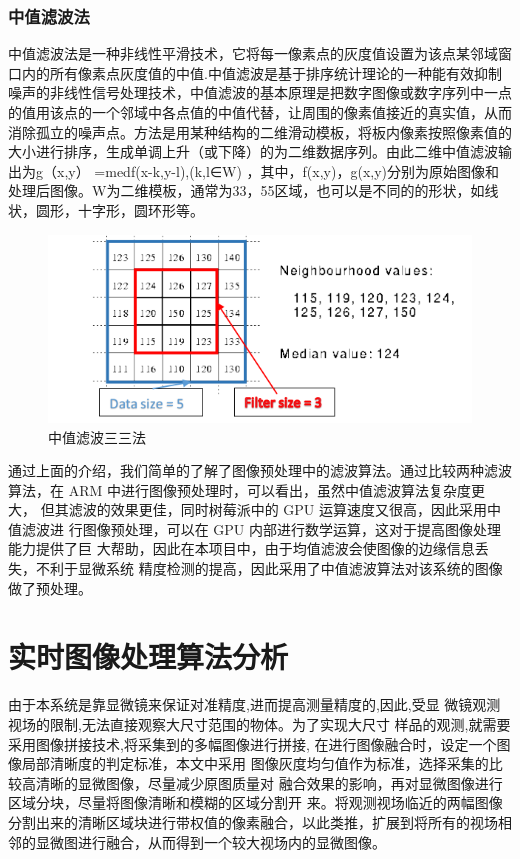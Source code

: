 \subsubsection{中值滤波法}
中值滤波法是一种非线性平滑技术，它将每一像素点的灰度值设置为该点某邻域窗口内的所有像素点灰度值的中值.中值滤波是基于排序统计理论的一种能有效抑制噪声的非线性信号处理技术，中值滤波的基本原理是把数字图像或数字序列中一点的值用该点的一个邻域中各点值的中值代替，让周围的像素值接近的真实值，从而消除孤立的噪声点。方法是用某种结构的二维滑动模板，将板内像素按照像素值的大小进行排序，生成单调上升（或下降）的为二维数据序列。由此二维中值滤波输出为g（x,y） =med{f(x-k,y-l),(k,l∈W)} ，其中，f(x,y)，g(x,y)分别为原始图像和处理后图像。W为二维模板，通常为33，55区域，也可以是不同的的形状，如线状，圆形，十字形，圆环形等。
\begin{figure}[h]
\centering
\includegraphics[width=0.7\linewidth]{Figure/median_2}
\caption{中值滤波三三法}
\label{fig:median_1}
\end{figure}

通过上面的介绍，我们简单的了解了图像预处理中的滤波算法。通过比较两种滤波算法，在 ARM 中进行图像预处理时，可以看出，虽然中值滤波算法复杂度更大， 但其滤波的效果更佳，同时树莓派中的 GPU 运算速度又很高，因此采用中值滤波进 行图像预处理，可以在 GPU 内部进行数学运算，这对于提高图像处理能力提供了巨 大帮助，因此在本项目中，由于均值滤波会使图像的边缘信息丢失，不利于显微系统 精度检测的提高，因此采用了中值滤波算法对该系统的图像做了预处理。

\section{实时图像处理算法分析}
由于本系统是靠显微镜来保证对准精度,进而提高测量精度的,因此,受显
微镜观测视场的限制,无法直接观察大尺寸范围的物体。为了实现大尺寸
样品的观测,就需要采用图像拼接技术,将采集到的多幅图像进行拼接,
在进行图像融合时，设定一个图像局部清晰度的判定标准，本文中采用 图像灰度均匀值作为标准，选择采集的比较高清晰的显微图像，尽量减少原图质量对 融合效果的影响，再对显微图像进行区域分块，尽量将图像清晰和模糊的区域分割开 来。将观测视场临近的两幅图像分割出来的清晰区域块进行带权值的像素融合，以此类推，扩展到将所有的视场相邻的显微图进行融合，从而得到一个较大视场内的显微图像\cite{fastprocessing}。 

